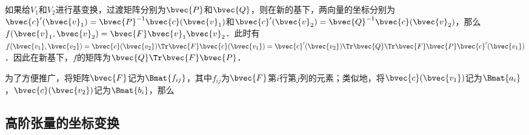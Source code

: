 如果给$V_1$和$V_2$进行基变换，过渡矩阵分别为$\bvec{P}$和$\bvec{Q}$，则在新的基下，两向量的坐标分别为$\bvec{c}'(\bvec{v}_1)=\bvec{P}^{-1}\bvec{c}(\bvec{v}_1)$和$\bvec{c}'(\bvec{v}_2)=\bvec{Q}^{-1}\bvec{c}(\bvec{v}_2)$，那么$f(\bvec{v}_1, \bvec{v}_2)=\bvec{F}\bvec{v}_1\bvec{v}_2$．此时有$f(\bvec{v_1},\bvec{v_2})=\bvec{c}(\bvec{v_2})\Tr\bvec{F}\bvec{c}(\bvec{v_1})=\bvec{c}'(\bvec{v_2})\Tr\bvec{Q}\Tr\bvec{F}\bvec{P}\bvec{c}'(\bvec{v_1})$．因此在新基下，$f$的矩阵为$\bvec{Q}\Tr\bvec{F}\bvec{P}$．

为了方便推广，将矩阵$\bvec{F}$记为$\Bmat {f_{ij}}$，其中$f_{ij}$为$\bvec{F}$第$i$行第$j$列的元素；类似地，将$\bvec{c}(\bvec{v_1})$记为$\Bmat {a_i}$，$\bvec{c}(\bvec{v_2})$记为$\Bmat {b_i}$，那么
\subsection{高阶张量的坐标变换}








